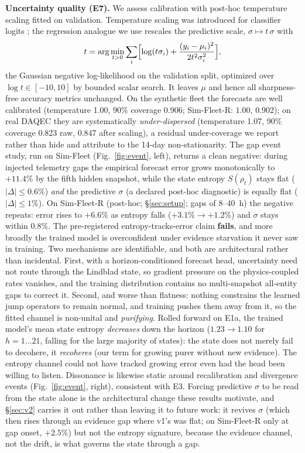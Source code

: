 \documentclass[journal]{IEEEtran}
\begin{document}
\textbf{Uncertainty quality (E7).} We assess calibration with post-hoc temperature
scaling fitted on validation. Temperature scaling was introduced for classifier
logits \cite{guo2017calibration}; the regression analogue we use rescales the
predictive scale, $\sigma \mapsto t\,\sigma$ with
\begin{equation}
t = \arg\min_{t>0} \sum_i \Bigl[\log(t\sigma_i)
  + \frac{(y_i-\mu_i)^2}{2t^2\sigma_i^2}\Bigr],
\end{equation}
the Gaussian negative log-likelihood on the validation split, optimized over
$\log t \in [-10,10]$ by bounded scalar search. It leaves $\mu$ and hence all
sharpness-free accuracy metrics unchanged. On the synthetic fleet the
forecasts are well calibrated (temperature 1.00, 90\% coverage
0.906; Sim-Fleet-R: $1.00$, $0.902$); on real DAQEC they are systematically
\emph{under-dispersed}
(temperature 1.07, 90\% coverage 0.823 raw,
0.847 after scaling), a residual under-coverage we report
rather than hide and attribute to the 14-day non-stationarity. The gap event study,
run on Sim-Fleet (Fig.~\ref{fig:event}, left), returns a clean negative: during injected telemetry
gaps the empirical forecast error grows monotonically to $+11.4\%$ by the fifth
hidden snapshot, while the state entropy $S(\rho_t)$ stays flat ($|\Delta| \leq
0.6\%$) \emph{and} the predictive $\sigma$ (a declared post-hoc diagnostic) is
equally flat ($|\Delta| \leq 1\%$). On Sim-Fleet-R (post-hoc; \S\ref{sec:setup}; gaps of
\mbox{8--40}~h) the negative repeats: error rises to $+6.6\%$ as entropy falls ($+3.1\%
\to +1.2\%$) and $\sigma$ stays within $0.8\%$. The pre-registered entropy-tracks-error claim
\textbf{fails}, and more broadly the trained model is overconfident under
evidence starvation it never saw in training. Two mechanisms are identifiable, and
both are architectural rather than incidental. First, with a horizon-conditioned
forecast head, uncertainty need not route through the Lindblad state, so gradient
pressure on the physics-coupled rates vanishes, and the training distribution
contains no multi-snapshot all-entity gaps to correct it. Second, and worse than
flatness: nothing constrains the learned jump operators to remain normal, and
training pushes them away from it, so the fitted channel is non-unital and
\emph{purifying}. Rolled forward on E1a, the trained model's mean state entropy
\emph{decreases} down the horizon ($1.23 \to 1.10$ for $h = 1\ldots21$, falling for
the large majority of states): the state does not merely fail to decohere, it
\emph{recoheres} (our term for growing purer without new evidence). The entropy
channel could not have tracked growing error even had the
head been willing to listen. Dissonance is likewise static around
recalibration and divergence events (Fig.~\ref{fig:event}, right), consistent
with E3. Forcing predictive $\sigma$ to be read from the state alone is the
architectural change these results motivate, and \S\ref{sec:v2} carries it out rather
than leaving it to future work: it revives $\sigma$ (which then rises through an
evidence gap where v1's was flat; on Sim-Fleet-R only at gap onset, $+2.5\%$) but not
the entropy signature, because the
evidence channel, not the drift, is what governs the state through a gap.
\end{document}
